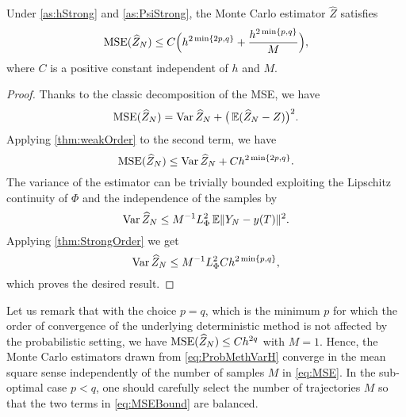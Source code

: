 \documentclass[10pt]{article}
\begin{document}
\begin{theorem}\label{thm:MSEMonteCarlo} Under \cref{as:hStrong} and \cref{as:PsiStrong}, the Monte Carlo estimator $\hat Z$ satisfies
	\begin{equation}\label{eq:MSEBound}
		\operatorname{MSE}(\widehat Z_N) \leq C\Big(h^{2\min\{2p, q\}} + \frac{h^{2\min\{p, q\}}}{M}\Big),
	\end{equation}
	where $C$ is a positive constant independent of $h$ and $M$.
\end{theorem}
\begin{proof} Thanks to the classic decomposition of the MSE, we have
	\begin{equation}\label{eq:MSEDecomposition}
		\operatorname{MSE}(\widehat Z_N) = \operatorname{Var} \widehat Z_N  + \big(\operatorname{\mathbb{E}}(\widehat Z_N - Z)\big)^2.
	\end{equation}
	Applying \cref{thm:weakOrder} to the second term, we have
	\begin{equation}\label{eq:MSEWeakOrder}
		\operatorname{MSE}(\widehat Z_N) \leq \operatorname{Var} \widehat Z_N  + Ch^{2\min\{2p, q\}}.
	\end{equation}
	The variance of the estimator can be trivially bounded exploiting the Lipschitz continuity of $\Phi$ and the independence of the samples by
	\begin{equation}\label{eq:MSELipschitz}
		\operatorname{Var}\widehat Z_N \leq M^{-1} L_\Phi^2 \operatorname{\mathbb{E}} \lVert Y_N - y(T)\rVert^2.
	\end{equation}
	Applying \cref{thm:StrongOrder} we get
	\begin{equation}
		\operatorname{Var}\widehat Z_N \leq M^{-1} L_\Phi^2 Ch^{2\min\{p, q\}},
	\end{equation}
	which proves the desired result.
\end{proof}
Let us remark that with the choice $p = q$, which is the minimum $p$ for which the order of convergence of the underlying deterministic method is not affected by the probabilistic setting, we have $\operatorname{MSE}(\widehat Z_N) \leq Ch^{2q}$ with $M = 1$. Hence, the Monte Carlo estimators drawn from \eqref{eq:ProbMethVarH} converge in the mean square sense independently of the number of samples $M$ in \eqref{eq:MSE}. In the sub-optimal case $p < q$, one should carefully select the number of trajectories $M$ so that the two terms in \eqref{eq:MSEBound} are balanced.
\end{document}
